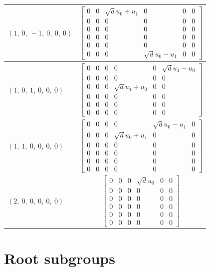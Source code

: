 \documentclass[11pt]{article}
\theoremstyle{definition}
\begin{document}
\begin{longtable}{|l|c|}
    \hline
    $\left( 1, \  0, \  -1, \  0, \  0, \  0\right)$ & ${\left[\begin{matrix}0 & 0 & \sqrt{d} u_{0} + u_{1} & 0 & 0 & 0\\0 & 0 & 0 & 0 & 0 & 0\\0 & 0 & 0 & 0 & 0 & 0\\0 & 0 & 0 & 0 & 0 & 0\\0 & 0 & 0 & 0 & 0 & 0\\0 & 0 & 0 & \sqrt{d} u_{0} - u_{1} & 0 & 0\end{matrix}\right]}$ \\
    \hline
    $\left( 1, \  0, \  1, \  0, \  0, \  0\right)$ & ${\left[\begin{matrix}0 & 0 & 0 & 0 & 0 & \sqrt{d} u_{1} - u_{0}\\0 & 0 & 0 & 0 & 0 & 0\\0 & 0 & 0 & \sqrt{d} u_{1} + u_{0} & 0 & 0\\0 & 0 & 0 & 0 & 0 & 0\\0 & 0 & 0 & 0 & 0 & 0\\0 & 0 & 0 & 0 & 0 & 0\end{matrix}\right]}$ \\
    \hline
    $\left( 1, \  1, \  0, \  0, \  0, \  0\right)$ & ${\left[\begin{matrix}0 & 0 & 0 & 0 & \sqrt{d} u_{0} - u_{1} & 0\\0 & 0 & 0 & \sqrt{d} u_{0} + u_{1} & 0 & 0\\0 & 0 & 0 & 0 & 0 & 0\\0 & 0 & 0 & 0 & 0 & 0\\0 & 0 & 0 & 0 & 0 & 0\\0 & 0 & 0 & 0 & 0 & 0\end{matrix}\right]}$ \\
    \hline
    $\left( 2, \  0, \  0, \  0, \  0, \  0\right)$ & ${\left[\begin{matrix}0 & 0 & 0 & \sqrt{d} u_{0} & 0 & 0\\0 & 0 & 0 & 0 & 0 & 0\\0 & 0 & 0 & 0 & 0 & 0\\0 & 0 & 0 & 0 & 0 & 0\\0 & 0 & 0 & 0 & 0 & 0\\0 & 0 & 0 & 0 & 0 & 0\end{matrix}\right]}$ \\
    \hline
\end{longtable}


\newpage
\section{Root subgroups}
\end{document}
